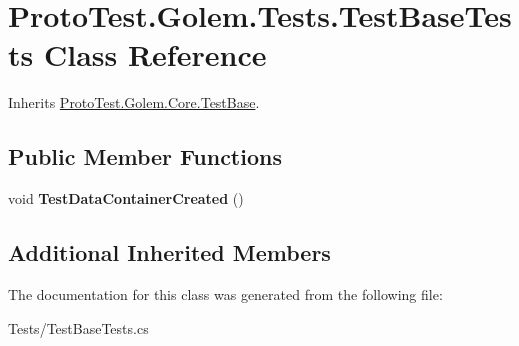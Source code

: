 \hypertarget{class_proto_test_1_1_golem_1_1_tests_1_1_test_base_tests}{\section{Proto\-Test.\-Golem.\-Tests.\-Test\-Base\-Tests Class Reference}
\label{class_proto_test_1_1_golem_1_1_tests_1_1_test_base_tests}
}


Inherits \hyperlink{class_proto_test_1_1_golem_1_1_core_1_1_test_base}{Proto\-Test.\-Golem.\-Core.\-Test\-Base}.

\subsection*{Public Member Functions}
\begin{DoxyCompactItemize}
\item 
\hypertarget{class_proto_test_1_1_golem_1_1_tests_1_1_test_base_tests_a5b5f130dcb1efe8020259f304219a1fc}{void {\bfseries Test\-Data\-Container\-Created} ()}\label{class_proto_test_1_1_golem_1_1_tests_1_1_test_base_tests_a5b5f130dcb1efe8020259f304219a1fc}

\end{DoxyCompactItemize}
\subsection*{Additional Inherited Members}


The documentation for this class was generated from the following file\-:\begin{DoxyCompactItemize}
\item 
Tests/Test\-Base\-Tests.\-cs\end{DoxyCompactItemize}
